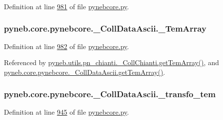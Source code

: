 Definition at line \hyperlink{pynebcore_8py_source_l00981}{981} of file \hyperlink{pynebcore_8py_source}{pynebcore.\+py}.

\hypertarget{classpyneb_1_1core_1_1pynebcore_1_1___coll_data_ascii_adb47c4cf2b9f3b82a281d0277e136693}{}
\subsubsection[{\+\_\+\+Tem\+Array}]{\setlength{\rightskip}{0pt plus 5cm}pyneb.\+core.\+pynebcore.\+\_\+\+Coll\+Data\+Ascii.\+\_\+\+Tem\+Array\hspace{0.3cm}{\ttfamily [private]}}\label{classpyneb_1_1core_1_1pynebcore_1_1___coll_data_ascii_adb47c4cf2b9f3b82a281d0277e136693}


Definition at line \hyperlink{pynebcore_8py_source_l00982}{982} of file \hyperlink{pynebcore_8py_source}{pynebcore.\+py}.



Referenced by \hyperlink{pn__chianti_8py_source_l00521}{pyneb.\+utils.\+pn\+\_\+chianti.\+\_\+\+Coll\+Chianti.\+get\+Tem\+Array()}, and \hyperlink{pynebcore_8py_source_l01110}{pyneb.\+core.\+pynebcore.\+\_\+\+Coll\+Data\+Ascii.\+get\+Tem\+Array()}.

\hypertarget{classpyneb_1_1core_1_1pynebcore_1_1___coll_data_ascii_aaf268c621d916f4ea71bb5825e249200}{}
\subsubsection[{\+\_\+transfo\+\_\+tem}]{\setlength{\rightskip}{0pt plus 5cm}pyneb.\+core.\+pynebcore.\+\_\+\+Coll\+Data\+Ascii.\+\_\+transfo\+\_\+tem\hspace{0.3cm}{\ttfamily [private]}}\label{classpyneb_1_1core_1_1pynebcore_1_1___coll_data_ascii_aaf268c621d916f4ea71bb5825e249200}


Definition at line \hyperlink{pynebcore_8py_source_l00945}{945} of file \hyperlink{pynebcore_8py_source}{pynebcore.\+py}.



